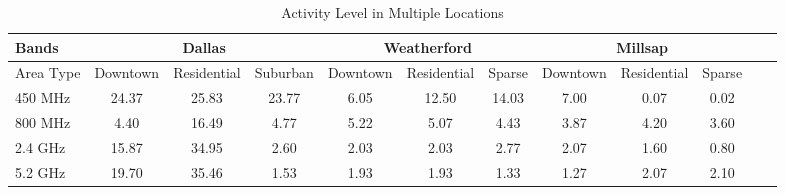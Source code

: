 %
%   
%
\begin{table}
\centering %
\begin{tabular}{|l|c|c|c|c|c|c|c|c|c|c|c|} %
\hline %
Bands     & \multicolumn{3}{c|}{Dallas} & \multicolumn{3}{c|}{Weatherford} & \multicolumn{3}{c|}{Millsap} \\%
\hline %
Area Type & Downtown & Residential & Suburban & Downtown &  Residential & Sparse & Downtown & Residential & Sparse \\ %
\hline %
450 MHz &24.37	&25.83  &23.77	&6.05 &12.50  &14.03 & 7.00 & 0.07 & 0.02 \\      
\hline %
800 MHz &4.40 	&16.49  &4.77	&5.22&5.07 &4.43  & 3.87 & 4.20 & 3.60 \\      
\hline %
2.4 GHz &15.87 	&34.95  &2.60	&2.03&2.03 &2.77  & 2.07 & 1.60 & 0.80 \\      
\hline %
5.2 GHz &19.70	&35.46  &1.53	&1.93&1.93 &1.33  & 1.27 & 2.07 & 2.10 \\      
\hline %
\end{tabular}    
\label{tab:activitymeasurement}    
\caption{Activity Level in Multiple Locations} %
\vspace{-0.3in}
\end{table}    

